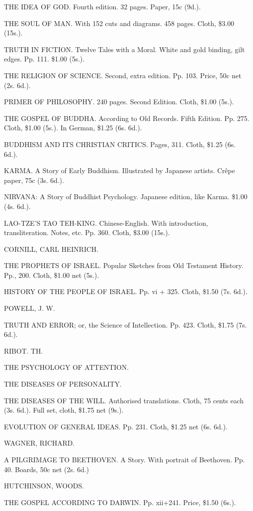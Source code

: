 \documentclass[12pt]{book}[2005/09/16]
\renewcommand{\(}{{\upshape(}}
\renewcommand{\)}{{\upshape)}}
\begin{document}
THE IDEA OF GOD.
Fourth edition. 32 pages. Paper, 15c (9d.).

THE SOUL OF MAN.
With 152 cuts and diagrams. 458 pages. Cloth, \$3.00 (15s.).

TRUTH IN FICTION. Twelve Tales with a Moral.
White and gold binding, gilt edges. Pp. 111. \$1.00 (5s.).

THE RELIGION OF SCIENCE.
Second, extra edition. Pp. 103. Price, 50c net (2s. 6d.).

PRIMER OF PHILOSOPHY.
240 pages. Second Edition. Cloth, \$1.00 (5s.).

THE GOSPEL OF BUDDHA. According to Old Records.
Fifth Edition. Pp. 275. Cloth, \$1.00 (5s.). In German, \$1.25 (6s. 6d.).

BUDDHISM AND ITS CHRISTIAN CRITICS.
Pages, 311. Cloth, \$1.25 (6s. 6d.).

KARMA. A Story of Early Buddhism.
Illustrated by Japanese artists. Crêpe paper, 75c (3s. 6d.).

NIRVANA: A Story of Buddhist Psychology.
Japanese edition, like Karma. \$1.00 (4s. 6d.).

LAO-TZE'S TAO TEH-KING.
Chinese-English. With introduction, transliteration. Notes, etc. Pp.
360. Cloth, \$3.00 (15s.).


CORNILL, CARL HEINRICH.

THE PROPHETS OF ISRAEL.
Popular Sketches from Old Testament History. Pp., 200. Cloth, \$1.00
net (5s.).

HISTORY OF THE PEOPLE OF ISRAEL.
Pp. vi + 325. Cloth, \$1.50 (7s. 6d.).


POWELL, J. W.

TRUTH AND ERROR; or, the Science of Intellection.
Pp. 423. Cloth, \$1.75 (7s. 6d.).


RIBOT. TH.

THE PSYCHOLOGY OF ATTENTION.

THE DISEASES OF PERSONALITY.

THE DISEASES OF THE WILL.
Authorised translations. Cloth, 75 cents each (3s. 6d.). Full set, cloth,
\$1.75 net (9s.).

EVOLUTION OF GENERAL IDEAS.
Pp. 231. Cloth, \$1.25 net (6s. 6d.).


WAGNER, RICHARD.

A PILGRIMAGE TO BEETHOVEN.
A Story. With portrait of Beethoven. Pp. 40. Boards, 50c net (2s. 6d.)


HUTCHINSON, WOODS.

THE GOSPEL ACCORDING TO DARWIN.
Pp. xii+241. Price, \$1.50 (6s.).
\end{document}
